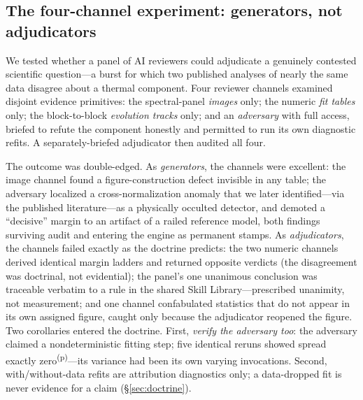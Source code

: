 \documentclass[twocolumn]{aastex631}
\newcommand{\prov}{\textsuperscript{(p)}}   %
\begin{document}
\subsection{The four-channel experiment: generators, not adjudicators}

We tested whether a panel of AI reviewers could adjudicate a genuinely
contested scientific question---a burst for which two published analyses of
nearly the same data disagree about a thermal component. Four reviewer
channels examined disjoint evidence primitives: the spectral-panel
\emph{images} only; the numeric \emph{fit tables} only; the block-to-block
\emph{evolution tracks} only; and an \emph{adversary} with full access,
briefed to refute the component honestly and permitted to run its own
diagnostic refits. A separately-briefed adjudicator then audited all four.

The outcome was double-edged. As \emph{generators}, the channels were
excellent: the image channel found a figure-construction defect invisible in
any table; the adversary localized a cross-normalization anomaly that we
later identified---via the published literature---as a physically occulted
detector, and demoted a ``decisive'' margin to an artifact of a railed
reference model, both findings surviving audit and entering the engine as
permanent stamps. As \emph{adjudicators}, the channels failed exactly as the
doctrine predicts: the two numeric channels derived identical margin ladders
and returned opposite verdicts (the disagreement was doctrinal, not
evidential); the panel's one unanimous conclusion was traceable verbatim to
a rule in the shared Skill Library---prescribed unanimity, not measurement;
and one channel confabulated statistics that do not appear in its own
assigned figure, caught only because the adjudicator reopened the figure.
Two corollaries entered the doctrine. First, \emph{verify the adversary
too}: the adversary claimed a nondeterministic fitting step; five identical
reruns showed spread exactly zero\prov---its variance had been its own
varying invocations. Second, with/without-data refits are attribution
diagnostics only; a data-dropped fit is never evidence for a claim
(\S\ref{sec:doctrine}).

\end{document}
